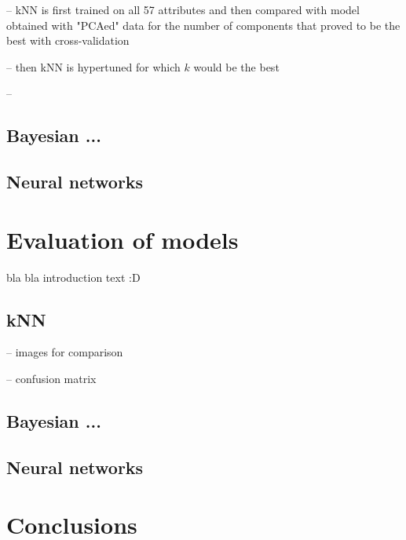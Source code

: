 \documentclass[12pt,a4paper]{article}
\begin{document}
-- kNN is first trained on all 57 attributes and then compared with model obtained with "PCAed" data for the number of components that proved to be the best with cross-validation

-- then kNN is hypertuned for which $k$ would be the best

-- 


\subsection{Bayesian ...}

\subsection{Neural networks}


\section{Evaluation of models}
\label{sec-evaluation}

bla bla introduction text :D

\subsection{kNN}

-- images for comparison

-- confusion matrix


\subsection{Bayesian ...}

\subsection{Neural networks}


\section{Conclusions}
\end{document}
